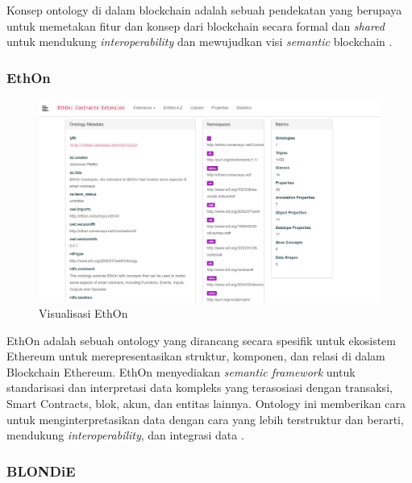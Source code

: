 Konsep ontology di dalam blockchain adalah sebuah pendekatan yang berupaya untuk memetakan fitur dan konsep dari blockchain secara formal dan \textit{shared} untuk mendukung \textit{interoperability} \parencite{9770809} dan mewujudkan visi \textit{semantic} blockchain \parencite{hector2020blondie}. 

\subsubsection{EthOn}
\label{subsubsec:ethon}

\begin{figure}
  \centering
  \includegraphics[width=1\textwidth]{resources/chapter-2/ethon.png}
  \caption{Visualisasi EthOn \parencite{ethon2024}}
  \label{image:ethon}
\end{figure}

EthOn adalah sebuah ontology yang dirancang secara spesifik untuk ekosistem Ethereum untuk merepresentasikan struktur, komponen, dan relasi di dalam Blockchain Ethereum. EthOn menyediakan \textit{semantic framework} untuk standarisasi dan interpretasi data kompleks yang terasosiasi dengan transaksi, Smart Contracts, blok, akun, dan entitas lainnya. Ontology ini memberikan cara untuk menginterpretasikan data dengan cara yang lebih terstruktur dan berarti, mendukung \textit{interoperability}, dan integrasi data \parencite{pfeffer2016ethon}.

\subsubsection{BLONDiE}
\label{subsubsec:blondie}

